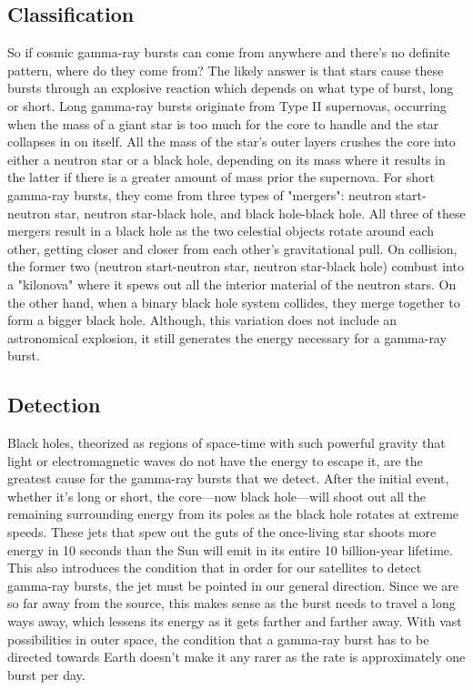 \documentclass[final,5p,times,twocolumn,authoryear]{elsarticle}
\begin{document}
\subsection{Classification}
So if cosmic gamma-ray bursts can come from anywhere and there's no definite pattern, where do they come from? The likely answer is that stars cause these bursts through an explosive reaction which depends on what type of burst, long or short. Long gamma-ray bursts originate from Type II supernovas, occurring when the mass of a giant star is too much for the core to handle and the star collapses in on itself. All the mass of the star's outer layers crushes the core into either a neutron star or a black hole, depending on its mass where it results in the latter if there is a greater amount of mass prior the supernova.
For short gamma-ray bursts, they come from three types of "mergers": neutron start-neutron star, neutron star-black hole, and black hole-black hole. All three of these mergers result in a black hole as the two celestial objects rotate around each other, getting closer and closer from each other's gravitational pull. On collision, the former two (neutron start-neutron star, neutron star-black hole) combust into a "kilonova" where it spews out all the interior material of the neutron stars. On the other hand, when a binary black hole system collides, they merge together to form a bigger black hole. Although, this variation does not include an astronomical explosion, it still generates the energy necessary for a gamma-ray burst. \citep{mergers}
\subsection{Detection}
Black holes, theorized as regions of space-time with such powerful gravity that light or electromagnetic waves do not have the energy to escape it, are the greatest cause for the gamma-ray bursts that we detect. After the initial event, whether it's long or short, the core—now black hole—will shoot out all the remaining surrounding energy from its poles as the black hole rotates at extreme speeds. These jets that spew out the guts of the once-living star shoots more energy in 10 seconds than the Sun will emit in its entire 10 billion-year lifetime. This also introduces the condition that in order for our satellites to detect gamma-ray bursts, the jet must be pointed in our general direction. Since we are so far away from the source, this makes sense as the burst needs to travel a long ways away, which lessens its energy as it gets farther and farther away.
With vast possibilities in outer space, the condition that a gamma-ray burst has to be directed towards Earth doesn't make it any rarer as the rate is approximately one burst per day. 
\end{document}
